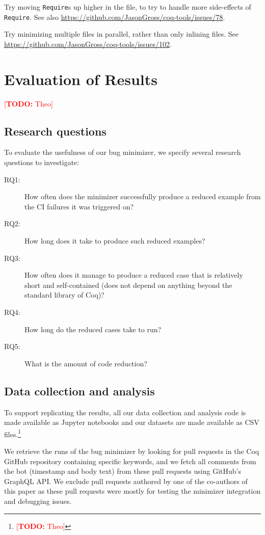 \documentclass[a4paper,USenglish,cleveref,autoref,thm-restate]{lipics-v2021}
\makeatletter
\newcommand{\todo}[1]{%
\@latex@warning{TODO: \detokenize{#1} on page \thepage}%
\textcolor{red}{[\textbf{TODO:} #1]}}%
\makeatother
\begin{document}
Try moving \texttt{Require}s up higher in the file, to try to handle more side-effects of \texttt{Require}.
See also \url{https://github.com/JasonGross/coq-tools/issues/78}.

Try minimizing multiple files in parallel, rather than only inlining files.
See \url{https://github.com/JasonGross/coq-tools/issues/102}.


\section{Evaluation of Results}

\todo{Theo}

\subsection{Research questions}

To evaluate the usefulness of our bug minimizer, we specify several research questions to investigate:

\begin{description}
\item[RQ1:] How often does the minimizer successfully produce a reduced example from the CI failures it was triggered on?
\item[RQ2:] How long does it take to produce such reduced examples?
\item[RQ3:] How often does it manage to produce a reduced case that is relatively short and self-contained (does not depend on anything beyond the standard library of Coq)?
\item[RQ4:] How long do the reduced cases take to run?
\item[RQ5:] What is the amount of code reduction?
\end{description}

\subsection{Data collection and analysis}

To support replicating the results, all our data collection and analysis code is made available as Jupyter notebooks and our datasets are made available as CSV files.\footnote{\todo{Theo}}

We retrieve the runs of the bug minimizer by looking for pull requests in the Coq GitHub repository containing specific keywords, and we fetch all comments from the bot (timestamp and body text) from these pull requests using GitHub's GraphQL API.
We exclude pull requests authored by one of the co-authors of this paper as these pull requests were mostly for testing the minimizer integration and debugging issues.
\end{document}
